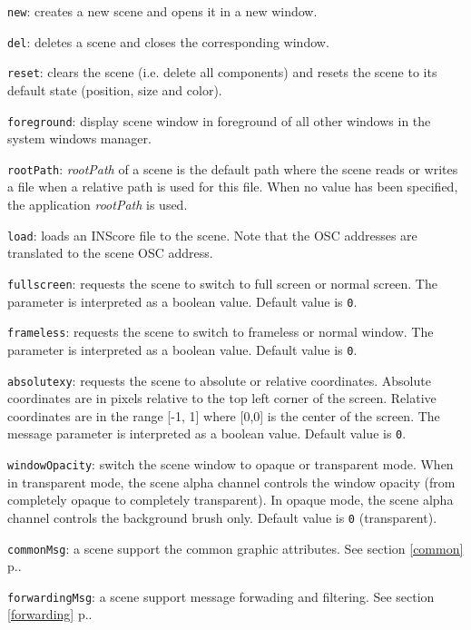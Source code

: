 \documentclass[a4paper,twoside]{report}
\newcommand{\fullref}[1]	{\ref{#1} p.\pageref{#1}}
\newcommand{\OSC}[1]		{\texttt{#1}}
\newcommand{\values}[1]		{\texttt{#1}}
\let\olditemize\itemize
\let\oldenditemize\enditemize
\renewenvironment{itemize} 	{\olditemize \setlength{\itemsep}{1mm}}{\oldenditemize}
\begin{document}
\begin{itemize}
\item \OSC{new}: creates a new scene and opens it in a new window.
\item \OSC{del}: deletes a scene and closes the corresponding window.
\item \OSC{reset}: clears the scene (i.e. delete all components) and resets the scene to its default state (position, size and color).
\item \OSC{foreground}: display scene window in foreground of all other windows in the system windows manager.
\item \OSC{rootPath}: \emph{rootPath} of a scene is the default path where the scene reads or writes a file when a relative path is used for this file. When no value has been specified, the application  \emph{rootPath} is used.
\item \OSC{load}: loads an INScore file to the scene. Note that the OSC addresses are translated to the scene OSC address.
\item \OSC{fullscreen}: requests the scene to switch to full screen or normal screen.  The parameter is interpreted as a boolean value. Default value is \values{0}.
\item \OSC{frameless}: requests the scene to switch to frameless or normal window.  The parameter is interpreted as a boolean value. Default value is \values{0}.
\item \OSC{absolutexy}: requests the scene to absolute or relative coordinates. Absolute coordinates are in pixels relative to the top left corner of the screen. Relative coordinates are in the range [-1, 1] where [0,0] is the center of the screen. The message parameter is interpreted as a boolean value. Default value is \values{0}.
\item \OSC{windowOpacity}: switch the scene window to opaque or transparent mode. When in transparent mode, the scene alpha channel controls the window opacity (from completely opaque to completely transparent). In opaque mode, the scene alpha channel controls the background brush only. Default value is \values{0} (transparent).
\item \OSC{commonMsg}: a scene support the common graphic attributes. See section \fullref{common}.
\item \OSC{forwardingMsg}: a scene support message forwading and filtering. See section \fullref{forwarding}.
\end{itemize}
\end{document}
